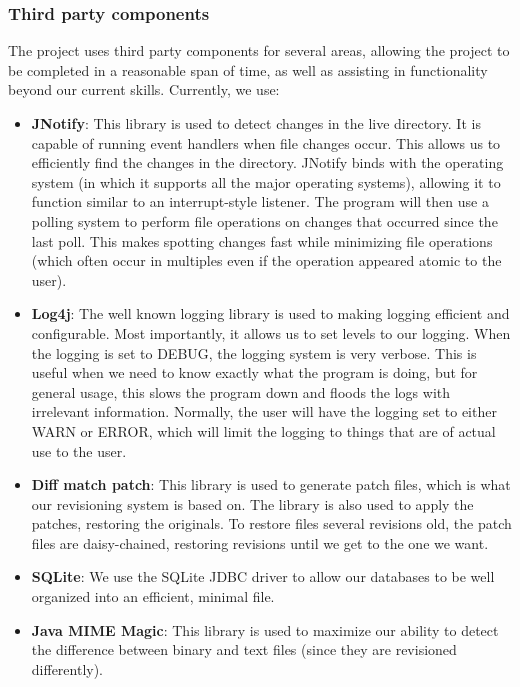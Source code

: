 \documentclass[12pt,a4paper]{article}
\begin{document}
\subsubsection{Third party components}
The project uses third party components for several areas, allowing the project to be completed in a reasonable span of time, as well as assisting in functionality beyond our current skills. Currently, we use:

\begin{itemize}
\item \textbf{JNotify}: This library is used to detect changes in the live directory. It is capable of running event handlers when file changes occur. This allows us to efficiently find the changes in the directory. JNotify binds with the operating system (in which it supports all the major operating systems), allowing it to function similar to an interrupt-style listener. The program will then use a polling system to perform file operations on changes that occurred since the last poll. This makes spotting changes fast while minimizing file operations (which often occur in multiples even if the operation appeared atomic to the user).
\item \textbf{Log4j}: The well known logging library is used to making logging efficient and configurable. Most importantly, it allows us to set levels to our logging. When the logging is set to DEBUG, the logging system is very verbose. This is useful when we need to know exactly what the program is doing, but for general usage, this slows the program down and floods the logs with irrelevant information. Normally, the user will have the logging set to either WARN or ERROR, which will limit the logging to things that are of actual use to the user.
\item \textbf{Diff match patch}: This library is used to generate patch files, which is what our revisioning system is based on. The library is also used to apply the patches, restoring the originals. To restore files several revisions old, the patch files are daisy-chained, restoring revisions until we get to the one we want.
\item \textbf{SQLite}: We use the SQLite JDBC driver to allow our databases to be well organized into an efficient, minimal file.
\item \textbf{Java MIME Magic}: This library is used to maximize our ability to detect the difference between binary and text files (since they are revisioned differently).
\end{itemize}
\end{document}
